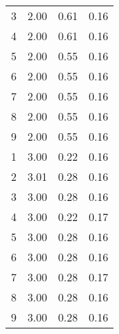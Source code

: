 \documentclass{report}
\begin{document}
\begin{table}[htbp]
\begin{tabular}{cccc}
3 & 2.00 & 0.61 & 0.16 \\
4 & 2.00 & 0.61 & 0.16 \\
5 & 2.00 & 0.55 & 0.16 \\
6 & 2.00 & 0.55 & 0.16 \\
7 & 2.00 & 0.55 & 0.16 \\
8 & 2.00 & 0.55 & 0.16 \\
9 & 2.00 & 0.55 & 0.16 \\
\cmidrule(lr){1-4}
1 & 3.00 & 0.22 & 0.16 \\
2 & 3.01 & 0.28 & 0.16 \\
3 & 3.00 & 0.28 & 0.16 \\
4 & 3.00 & 0.22 & 0.17 \\
5 & 3.00 & 0.28 & 0.16 \\
6 & 3.00 & 0.28 & 0.16 \\
7 & 3.00 & 0.28 & 0.17 \\
8 & 3.00 & 0.28 & 0.16 \\
9 & 3.00 & 0.28 & 0.16 \\
\bottomrule
\end{tabular}
\end{table}
\end{document}
